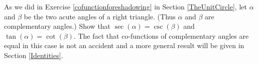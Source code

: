 {As we did in Exercise \ref{cofunctionforeshadowing} in Section \ref{TheUnitCircle}, let $\alpha$ and $\beta$ be the two acute angles of a right triangle.  (Thus $\alpha$ and $\beta$ are complementary angles.)  Show that $\sec(\alpha) = \csc(\beta)$ and $\tan(\alpha) = \cot(\beta)$.  The fact that co-functions of complementary angles are equal in this case is not an accident and a more general result will be given in Section \ref{Identities}.
\label{cofunctionforeshadowingagain}}
{}
